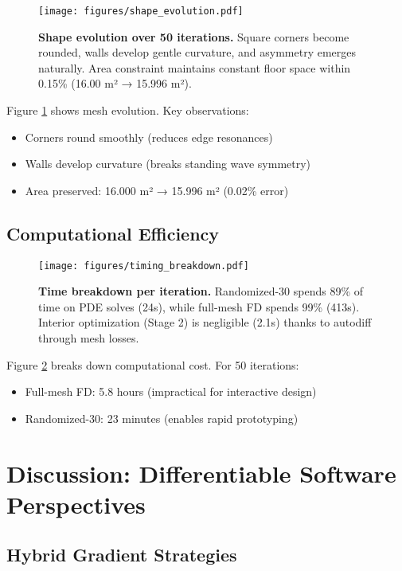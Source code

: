 \documentclass{article}
\begin{document}
\begin{figure}[t]
\centering
\texttt{[image: figures/shape\_evolution.pdf]}
\caption{\textbf{Shape evolution over 50 iterations.} Square corners become rounded, walls develop gentle curvature, and asymmetry emerges naturally. Area constraint maintains constant floor space within 0.15\% (16.00 m² → 15.996 m²).}
\label{fig:evolution}
\end{figure}

Figure \ref{fig:evolution} shows mesh evolution. Key observations:
\begin{itemize}
    \item Corners round smoothly (reduces edge resonances)
    \item Walls develop curvature (breaks standing wave symmetry)
    \item Area preserved: 16.000 m² → 15.996 m² (0.02\% error)
\end{itemize}

\subsection{Computational Efficiency}

\begin{figure}[t]
\centering
\texttt{[image: figures/timing\_breakdown.pdf]}
\caption{\textbf{Time breakdown per iteration.} Randomized-30 spends 89\% of time on PDE solves (24s), while full-mesh FD spends 99\% (413s). Interior optimization (Stage 2) is negligible (2.1s) thanks to autodiff through mesh losses.}
\label{fig:timing}
\end{figure}

Figure \ref{fig:timing} breaks down computational cost. For 50 iterations:
\begin{itemize}
    \item Full-mesh FD: 5.8 hours (impractical for interactive design)
    \item Randomized-30: 23 minutes (enables rapid prototyping)
\end{itemize}

\section{Discussion: Differentiable Software Perspectives}

\subsection{Hybrid Gradient Strategies}
\end{document}
